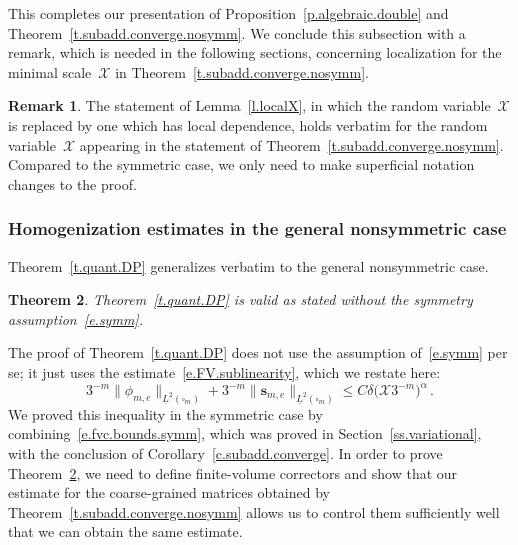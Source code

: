 \documentclass[11pt]{article} %
\let\oldsquare\square %
\renewcommand{\square}{\oldsquare}
\numberwithin{equation}{section}
\newtheorem{theorem}{Theorem}[section]
\theoremstyle{definition}
\newtheorem{remark}[theorem]{Remark}
\newcommand{\s}{\mathbf{s}}
\newcommand{\cu}{\square}
\newcommand{\X}{\mathcal{X}}
\begin{document}
\smallskip

This completes our presentation of Proposition~\ref{p.algebraic.double} and Theorem~\ref{t.subadd.converge.nosymm}. We conclude this subsection with a remark, which is needed in the following sections, concerning localization for the minimal scale~$\X$ in Theorem~\ref{t.subadd.converge.nosymm}.

\begin{remark} 
\label{r.localX.nonsymm}
The statement of Lemma~\ref{l.localX}, in which the random variable~$\X$ is replaced by one which has local dependence, holds verbatim for the random variable~$\X$ appearing in the statement of Theorem~\ref{t.subadd.converge.nosymm}. Compared to the symmetric case, 
we only need to make superficial notation changes to the proof. 
\end{remark}




\subsubsection{Homogenization estimates in the general nonsymmetric case}
\hspace{-5pt}
Theorem~\ref{t.quant.DP} generalizes verbatim to the general nonsymmetric case. 

\begin{theorem}
\label{t.quant.DP.nosymm}Theorem~\ref{t.quant.DP} is valid as stated without the symmetry assumption~\eqref{e.symm}. 
\end{theorem}

The proof of Theorem~\ref{t.quant.DP} does not use the assumption of~\eqref{e.symm} per se; it just uses the estimate~\eqref{e.FV.sublinearity}, which we restate here: 
\begin{equation}
\label{e.FV.sublinearity.nosymm}
3^{-m} \| \phi_{m,e} \|_{\underline{L}^2(\cu_m)} 
+
3^{-m} \| \s_{m,e} \|_{\underline{L}^2(\cu_m)} 
\leq 
C \delta \bigl( \X 3^{-m} \bigr)^{\alpha}
\,.
\end{equation}
We proved this inequality in the symmetric case by combining~\eqref{e.fvc.bounds.symm}, which was proved in Section~\ref{ss.variational}, with the conclusion of 
Corollary~\ref{c.subadd.converge}. 
In order to prove Theorem~\ref{t.quant.DP.nosymm}, we need to define finite-volume correctors and show that our estimate for the coarse-grained matrices obtained by Theorem~\ref{t.subadd.converge.nosymm} allows us to control them sufficiently well that we can obtain the same estimate. 
\end{document}
